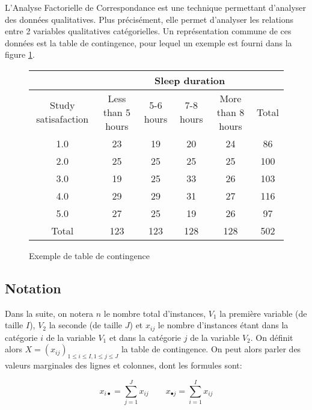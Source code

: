 L'Analyse Factorielle de Correspondance est une technique permettant d'analyser des données qualitatives. 
Plus précisément, elle permet d'analyser les relations entre 2 variables qualitatives catégorielles. Un représentation commune de ces données est la table de contingence, pour lequel un exemple est fourni dans la figure \ref{cont-table}. 

\begin{figure}[!h]
\begin{center}
  \begin{tabular}{| c | c | c | c | c | c |}
    \hline
    & \multicolumn{5}{|c|}{Sleep duration}\\
    \hline
    Study satisafaction & Less than 5 hours & 5-6 hours & 7-8 hours & More than 8 hours & Total\\
    \hline
    1.0 & 23 & 19 & 20 & 24 & 86 \\ 
    \hline 
    2.0 & 25 & 25 & 25 & 25 & 100\\ 
    \hline 
    3.0 & 19 & 25 & 33 & 26 & 103\\ 
    \hline 
    4.0 & 29 & 29 & 31 & 27 & 116\\ 
    \hline 
    5.0 & 27 & 25 & 19 & 26 & 97\\ 
    \hline
    Total & 123 & 123 & 128 & 128 & 502 \\ 
    \hline

  \end{tabular}
\end{center}
  \caption{Exemple de table de contingence}
  \label{cont-table}
\end{figure}

\subsection{Notation}

Dans la suite, on notera $n$ le nombre total d'instances, $V_1$ la première variable (de taille $I$), $V_2$ la seconde (de taille $J$) et $x_{ij}$ le nombre d'instances étant dans la catégorie $i$ de la variable $V_1$ et dans la catégorie $j$ de la variable $V_2$.
On définit alors $X = (x_{ij})_{1 \leq i \leq I, 1 \leq j \leq J}$ la table de contingence. On peut alors parler des valeurs marginales des lignes et colonnes, dont les formules sont:

\begin{equation}
  x_{i\bullet} = \sum_{j=1}^J x_{ij} \qquad 
  x_{\bullet j} = \sum_{i=1}^I x_{ij}
\end{equation}

